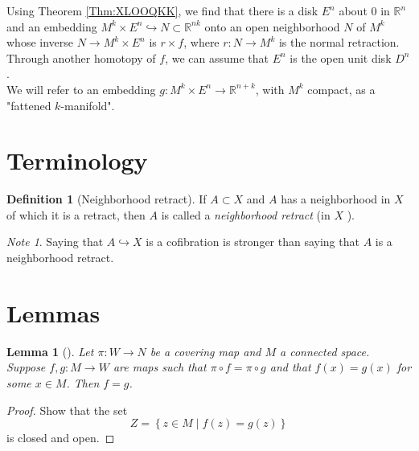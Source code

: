 \documentclass[reqno]{amsart}
\newtheorem{lemma}[theorem]{Lemma}
\theoremstyle{definition}
\newtheorem{definition}[theorem]{Definition}
\theoremstyle{remark}
\newtheorem*{note}{Note}
\begin{document}
Using Theorem \ref{Thm:XLOOQKK}, we find that
there is a disk $E^{n}$ about $0$ in $\mathbb{R}^{n}$ and
an embedding $M^{k} \times E^{n} \hookrightarrow 
N \subset \mathbb{R}^{n k} $ onto an open neighborhood
$N$ of $M^{k}$ whose inverse $N \to 
M^{k} \times E^{n}$ is $r \times f$, where
$r \colon N \to  M^{k}$ is the normal retraction.\\
\linebreak
Through another homotopy of $f$, we can assume that
$E^{n}$ is the open unit disk
$D^{n}$.\\

We will refer to an embedding
$g \colon M^{k} \times E^{n} \to \mathbb{R}^{n+k}$, with
$M^{k}$ compact, as a
"fattened $k$-manifold".




\section{Terminology}

\begin{definition}[Neighborhood retract]
    If $A \subset X$ and $A$ has a neighborhood in $X$ of
    which it is a retract, then $A$ is called
    a \textit{neighborhood retract} (in $X$ ).
\end{definition}

\begin{note}
    Saying that $A \hookrightarrow X$ is a cofibration
    is stronger than saying that $A$ is a neighborhood retract.
\end{note}

\section{Lemmas}

\begin{lemma}[]\label{Lemma:XIOOQLSJ}
    Let $\pi \colon W \to N$ be a covering map and
    $M$ a connected space. Suppose
    $f,g \colon M \to W$ are maps such that
    $\pi \circ f = \pi \circ g$ and that
    $f(x) = g(x)$ for some $x \in M$. Then
    $f = g$.
\end{lemma}

\begin{proof}
    Show that the set
    \[
    Z = \left\{ z \in M  \mid f(z) = g(z)\right\} 
    \] 
    is closed and open.
\end{proof}




\newpage
\printbibliography
\end{document}
